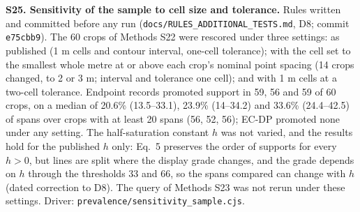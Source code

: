 \documentclass[11pt]{article}
\begin{document}
\vspace{4mm}
\noindent\textbf{S25. Sensitivity of the sample to cell size and tolerance.} Rules written and committed before any run (\texttt{docs/\allowbreak RULES\_\allowbreak ADDITIONAL\_\allowbreak TESTS.md}, D8; commit \texttt{e75cbb9}). The 60 crops of Methods S22 were rescored under three settings: as published (1 m cells and contour interval, one-cell tolerance); with the cell set to the smallest whole metre at or above each crop's nominal point spacing (14 crops changed, to 2 or 3 m; interval and tolerance one cell); and with 1 m cells at a two-cell tolerance. Endpoint records promoted support in 59, 56 and 59 of 60 crops, on a median of 20.6\% (13.5--33.1), 23.9\% (14--34.2) and 33.6\% (24.4--42.5) of spans over crops with at least 20 spans (56, 52, 56); EC-DP promoted none under any setting. The half-saturation constant $h$ was not varied, and the results hold for the published $h$ only: Eq.~5 preserves the order of supports for every $h>0$, but lines are split where the display grade changes, and the grade depends on $h$ through the thresholds 33 and 66, so the spans compared can change with $h$ (dated correction to D8). The query of Methods S23 was not rerun under these settings. Driver: \texttt{prevalence/sensitivity\_sample.cjs}.
\end{document}
